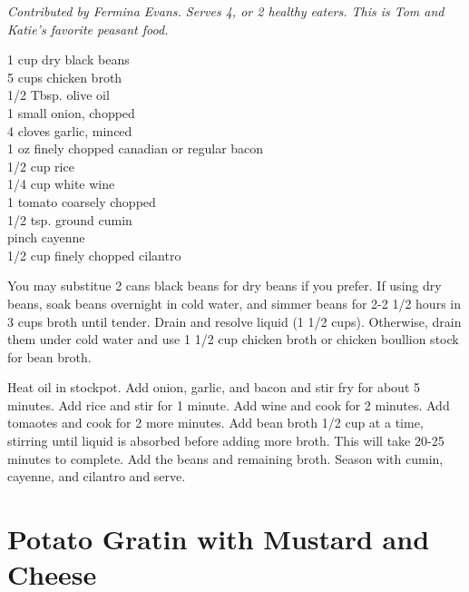 \textit{Contributed by Fermina Evans. Serves 4, or 2 healthy eaters. This is
Tom and Katie's favorite peasant food.}
\begin{ingredients}
1 cup dry black beans\\
5 cups chicken broth\\
1/2 Tbsp. olive oil \\
1 small onion, chopped \\
4 cloves garlic, minced \\
1 oz finely chopped canadian or regular bacon \\
1/2 cup rice \\
1/4 cup white wine \\
1 tomato coarsely chopped \\
1/2 tsp. ground cumin \\
pinch cayenne \\
1/2 cup finely chopped cilantro
\end{ingredients}
You may substitue 2 cans black beans for dry beans if you prefer. If using dry
beans, soak beans overnight in cold water, and simmer beans for 2-2 1/2 hours in
3 cups broth until tender. Drain and resolve liquid (1 1/2 cups). Otherwise,
drain them under cold water and use 1 1/2 cup chicken broth or chicken
boullion stock for bean broth.  

Heat oil in stockpot. Add onion, garlic, and bacon and stir fry for about 5
minutes.  Add rice and stir for 1 minute. Add wine and cook for 2 minutes. Add
tomaotes and cook for 2 more minutes.  Add bean broth 1/2 cup at a time,
stirring until liquid is absorbed before adding more broth. This will take
20-25 minutes to complete. Add the beans and remaining broth. Season with cumin,
cayenne, and cilantro and serve. 

\section{Potato Gratin with Mustard and Cheese}

